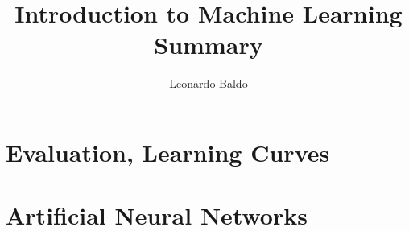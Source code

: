 \documentclass{article}
\title{Introduction to Machine Learning Summary}
\author{Leonardo Baldo}
\date{}
\begin{document}
\maketitle
\newpage

\tableofcontents
\newpage








\section{Evaluation, Learning Curves}
\newpage

\section{Artificial Neural Networks}
\newpage
\end{document}
